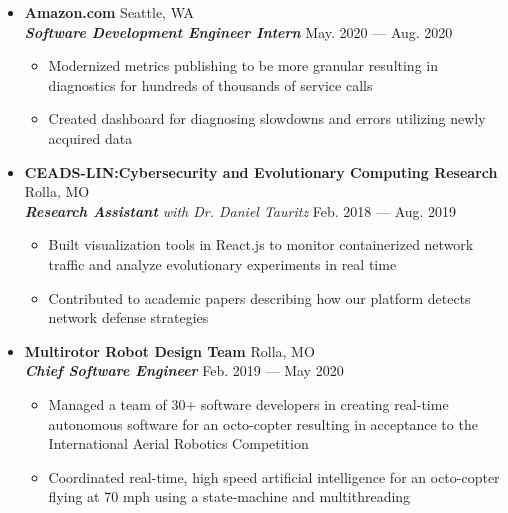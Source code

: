 \documentclass[9pt,oneside]{memoir}
\begin{document}
\begin{itemize}
      \item[] \textbf{Amazon.com}
            \hfill Seattle, WA\\
            \textit{\textbf{Software Development Engineer Intern}}
            \hfill May. 2020 --- Aug. 2020
            \begin{itemize}
                  \item[\textbullet] Modernized metrics publishing to be more granular resulting
                        in diagnostics for hundreds of thousands of service calls
                  \item[\textbullet] Created dashboard for diagnosing slowdowns and errors utilizing
                        newly acquired data
            \end{itemize}

      \item[] \textbf{CEADS-LIN:\@ Cybersecurity and Evolutionary Computing Research}
            \hfill Rolla, MO\\
            \textit{\textbf{Research Assistant} with Dr. Daniel Tauritz}
            \hfill Feb. 2018 --- Aug. 2019
            \begin{itemize}
                  \item[\textbullet] Built visualization tools in React.js to
                        monitor containerized network traffic and analyze evolutionary experiments
                        in real time
                  \item[\textbullet] Contributed to academic papers describing how our
                        platform detects network defense strategies
            \end{itemize}

      \item[] \textbf{Multirotor Robot Design Team}
            \hfill Rolla, MO\\
            \textit{\textbf{Chief Software Engineer}}
            \hfill Feb. 2019 --- May 2020
            \begin{itemize}
                  \item[\textbullet] Managed a team of 30+ software developers in
                        creating real-time autonomous software for an octo-copter resulting in
                        acceptance to the International Aerial Robotics Competition
                  \item[\textbullet] Coordinated real-time, high speed artificial intelligence for an
                        octo-copter flying at 70 mph using a state-machine and multithreading
            \end{itemize}


\end{itemize}
\end{document}
